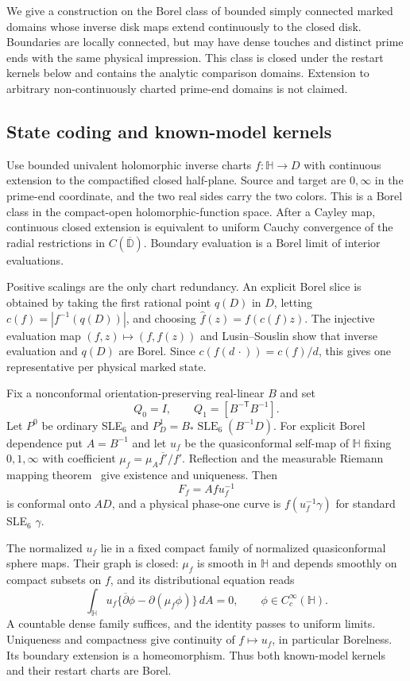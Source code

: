 We give a construction on the Borel class of bounded simply connected
marked domains whose inverse disk maps extend continuously to the
closed disk. Boundaries are locally connected, but may have dense
touches and distinct prime ends with the same physical impression.
This class is closed under the restart kernels below and contains
the analytic comparison domains. Extension to arbitrary non-continuously
charted prime-end domains is not claimed.

\subsection{State coding and known-model kernels}

Use bounded univalent holomorphic inverse charts $f:\mathbb H\to D$
with continuous extension to the compactified closed half-plane.
Source and target are $0,\infty$ in the prime-end coordinate, and
the two real sides carry the two colors.
This is a Borel class in the compact-open holomorphic-function space.
After a Cayley map, continuous closed extension is equivalent to
uniform Cauchy convergence of the radial restrictions in
$C(\overline{\mathbb D})$. Boundary evaluation is a Borel limit
of interior evaluations.

Positive scalings are the only chart redundancy. An explicit Borel
slice is obtained by taking the first rational point $q(D)$ in $D$,
letting $c(f)=|f^{-1}(q(D))|$, and choosing
$\widehat f(z)=f(c(f)z)$. The injective evaluation map
$(f,z)\mapsto(f,f(z))$ and Lusin--Souslin show that inverse evaluation
and $q(D)$ are Borel. Since $c(f(d\,\cdot))=c(f)/d$, this gives
one representative per physical marked state.

Fix a nonconformal orientation-preserving real-linear $B$ and set
\[
 Q_0=I,\qquad Q_1=[B^{-\mathsf T}B^{-1}].
 \tag{OS1}
\]
Let $P^0$ be ordinary SLE$_6$ and
$P^1_D=B_*\operatorname{SLE}_6(B^{-1}D)$.
For explicit Borel dependence put $A=B^{-1}$ and let $u_f$ be the
quasiconformal self-map of $\mathbb H$ fixing $0,1,\infty$ with
coefficient
$\mu_f=\mu_A\overline{f'}/f'$. Reflection and the measurable
Riemann mapping theorem~\cite{ahlfors-bers} give existence and uniqueness. Then
\[
 F_f=A f u_f^{-1}
 \tag{OS2}
\]
is conformal onto $AD$, and a physical phase-one curve is
$f(u_f^{-1}\gamma)$ for standard SLE$_6$ $\gamma$.

The normalized $u_f$ lie in a fixed compact family of normalized
quasiconformal sphere maps. Their graph is closed: $\mu_f$ is smooth
in $\mathbb H$ and depends smoothly on compact subsets on $f$,
and its distributional equation reads
\[
 \int_{\mathbb H} u_f
 \{\overline\partial\phi-\partial(\mu_f\phi)\}\,dA=0,
 \qquad \phi\in C_c^\infty(\mathbb H).
 \tag{OS3}
\]
A countable dense family suffices, and the identity passes to uniform
limits. Uniqueness and compactness give continuity of $f\mapsto u_f$,
in particular Borelness. Its boundary extension is a homeomorphism.
Thus both known-model kernels and their restart charts are Borel.

